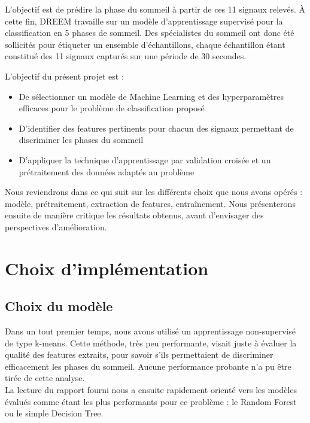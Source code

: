 \documentclass{article}
\begin{document}
L'objectif est de prédire la phase du sommeil à partir de ces 11 signaux relevés. À cette fin, DREEM travaille sur un modèle d'apprentissage supervisé pour la classification en 5 phases de sommeil. Des spécialistes du sommeil ont donc été sollicités pour étiqueter un ensemble d'échantillons, chaque échantillon étant constitué des 11 signaux capturés sur une période de 30 secondes.

\vspace{\baselineskip}

L'objectif du présent projet est :
\\
\begin{itemize}
\item De sélectionner un modèle de Machine Learning et des hyperparamètres efficaces pour le problème de classification proposé
\item D'identifier des features pertinents pour chacun des signaux permettant de discriminer les phases du sommeil
\item D'appliquer la technique d'apprentissage par validation croisée et un prétraitement des données adaptés au problème
\end{itemize}
\vspace{0.5cm}

Nous reviendrons dans ce qui suit sur les différents choix que nous avons opérés : modèle, prétraitement, extraction de features, entraînement. Nous présenterons ensuite de manière critique les résultats obtenus, avant d'envisager des perspectives d'amélioration.

\section{\hspace{0.3cm} Choix d'implémentation}
\subsection{Choix du modèle}

Dans un tout premier temps, nous avons utilisé un apprentissage non-supervisé de type k-means. Cette méthode, très peu performante, visait juste à évaluer la qualité des features extraits, pour savoir s'ils permettaient de discriminer efficacement les phases du sommeil. Aucune performance probante n'a pu être tirée de cette analyse.
\\

La lecture du rapport fourni nous a ensuite rapidement orienté vers les modèles évalués comme étant les plus performants pour ce problème : le Random Forest ou le simple Decision Tree.
\\
\end{document}
